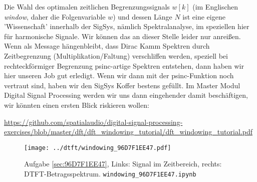 Die Wahl des optimalen zeitlichen Begrenzungssignals $w[k]$ (im Englischen \textit{window}, daher
die Folgenvariable $w$) und dessen Länge $N$ ist eine eigene 'Wissenschaft' innerhalb
der SigSys, nämlich Spektralanalyse, im speziellen hier für harmonische Signale.
Wir können das an dieser Stelle leider nur anreißen.
%
Wenn als Message hängenbleibt, dass Dirac Kamm Spektren durch Zeitbegrenzung (Multiplikation/Faltung)
verschliffen werden, speziell bei rechteckförmiger Begrenzung psinc-artige Spektren
entstehen, dann haben wir hier unseren Job gut erledigt.
%
Wenn wir dann mit der psinc-Funktion noch vertraut sind, haben wir den SigSys Koffer
bestens gefüllt.
%
Im Master Modul Digital Signal Processing werden wir uns dann eingehender damit
beschäftigen, wir könnten einen ersten Blick riskieren wollen:

\url{https://github.com/spatialaudio/digital-signal-processing-exercises/blob/master/dft/dft_windowing_tutorial/dft_windowing_tutorial.pdf}


\begin{figure}
\centering
\texttt{[image: ../dtft/windowing\_96D7F1EE47.pdf]}
\caption{Aufgabe \ref{sec:96D7F1EE47}, Links: Signal im Zeitbereich,
rechts: DTFT-Betragsspektrum.
\texttt{windowing\_96D7F1EE47.ipynb}}
\label{fig:windowing_96D7F1EE47}
\end{figure}
